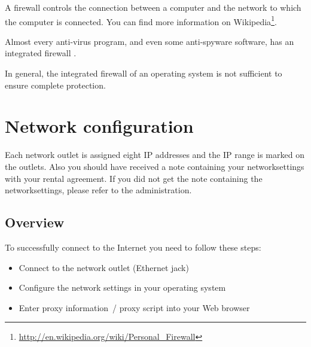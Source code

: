 \documentclass[a4paper,12pt]{scrartcl}
\begin{document}
A firewall controls the connection between a computer and the network to which the computer is connected. You can find more information on Wikipedia\footnote{\url{http://en.wikipedia.org/wiki/Personal\_Firewall}}.

Almost every anti-virus program, and even some anti-spyware software, has an integrated firewall .

In general, the integrated firewall of an operating system is not sufficient to ensure complete protection.
\newpage

\section*{Network configuration}

Each network outlet is assigned eight IP addresses and the IP range is marked on the outlets. Also you should have received a note containing your networksettings with your rental agreement. If you did not get the note containing the networksettings, please refer to the administration.

\subsection*{Overview}

To successfully connect to the Internet you need to follow these steps:
\begin{itemize}
    \item Connect to the network outlet (Ethernet jack)
    \item Configure the network settings in your operating system
    \item Enter proxy information~/ proxy script into your Web browser
\end{itemize}
\end{document}
